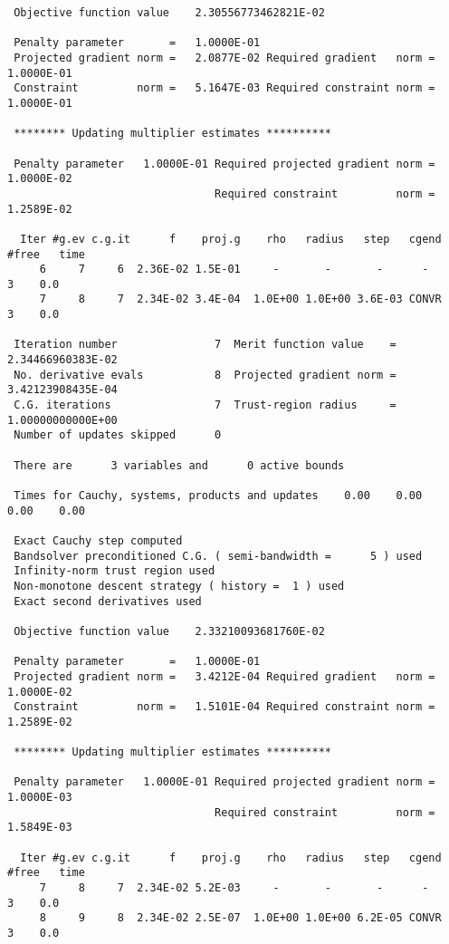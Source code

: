 \documentclass{article}
\begin{document}
{{\begin{verbatim}
 Objective function value    2.30556773462821E-02

 Penalty parameter       =   1.0000E-01
 Projected gradient norm =   2.0877E-02 Required gradient   norm =   1.0000E-01
 Constraint         norm =   5.1647E-03 Required constraint norm =   1.0000E-01

 ******** Updating multiplier estimates **********

 Penalty parameter   1.0000E-01 Required projected gradient norm =   1.0000E-02
                                Required constraint         norm =   1.2589E-02

  Iter #g.ev c.g.it      f    proj.g    rho   radius   step   cgend #free   time
     6     7     6  2.36E-02 1.5E-01     -       -       -      -       3    0.0
     7     8     7  2.34E-02 3.4E-04  1.0E+00 1.0E+00 3.6E-03 CONVR     3    0.0

 Iteration number               7  Merit function value    =   2.34466960383E-02
 No. derivative evals           8  Projected gradient norm =   3.42123908435E-04
 C.G. iterations                7  Trust-region radius     =   1.00000000000E+00
 Number of updates skipped      0

 There are      3 variables and      0 active bounds

 Times for Cauchy, systems, products and updates    0.00    0.00    0.00    0.00

 Exact Cauchy step computed
 Bandsolver preconditioned C.G. ( semi-bandwidth =      5 ) used
 Infinity-norm trust region used
 Non-monotone descent strategy ( history =  1 ) used
 Exact second derivatives used

 Objective function value    2.33210093681760E-02

 Penalty parameter       =   1.0000E-01
 Projected gradient norm =   3.4212E-04 Required gradient   norm =   1.0000E-02
 Constraint         norm =   1.5101E-04 Required constraint norm =   1.2589E-02

 ******** Updating multiplier estimates **********

 Penalty parameter   1.0000E-01 Required projected gradient norm =   1.0000E-03
                                Required constraint         norm =   1.5849E-03

  Iter #g.ev c.g.it      f    proj.g    rho   radius   step   cgend #free   time
     7     8     7  2.34E-02 5.2E-03     -       -       -      -       3    0.0
     8     9     8  2.34E-02 2.5E-07  1.0E+00 1.0E+00 6.2E-05 CONVR     3    0.0


\end{verbatim}}}
\end{document}
